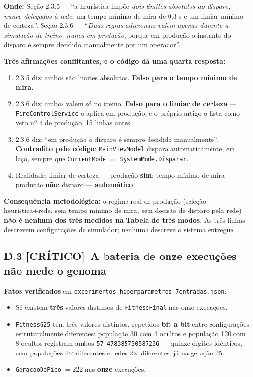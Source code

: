 \documentclass[11pt,a4paper]{article}
\newcommand{\critico}{\textbf{\color{red!60!black}[CRÍTICO]}}
\begin{document}
\textbf{Onde:} Seção 2.3.5 --- ``a heurística impõe \emph{dois limites absolutos ao disparo, nunca
delegados à rede}: um tempo mínimo de mira de 0,3 s e um limiar mínimo de certeza''. Seção 2.3.6 ---
``\emph{Duas regras adicionais valem apenas durante a simulação de treino, nunca em produção},
porque em produção o instante do disparo é sempre decidido manualmente por um operador''.

\textbf{Três afirmações conflitantes, e o código dá uma quarta resposta:}

\begin{enumerate}
  \item 2.3.5 diz: ambos são limites absolutos. \textbf{Falso para o tempo mínimo de mira.}
  \item 2.3.6 diz: ambos valem só no treino. \textbf{Falso para o limiar de certeza} ---
  \texttt{FireControlService} o aplica em produção, e o próprio artigo o lista como veto nº 4 de
  produção, 15 linhas antes.
  \item 2.3.6 diz: ``em produção o disparo é sempre decidido manualmente''. \textbf{Contradito pelo
  código}: \texttt{MainViewModel} dispara automaticamente, em laço, sempre que
  \texttt{CurrentMode == SystemMode.Disparar}.
  \item Realidade: limiar de certeza --- produção \textbf{sim}; tempo mínimo de mira --- produção
  \textbf{não}; disparo --- \textbf{automático}.
\end{enumerate}

\textbf{Consequência metodológica:} o regime real de produção (seleção heurística+rede, sem tempo
mínimo de mira, sem decisão de disparo pela rede) \textbf{não é nenhum dos três medidos na Tabela de
três modos}. As três linhas descrevem configurações do simulador; nenhuma descreve o sistema
entregue.

\subsection*{D.3 \critico\ A bateria de onze execuções não mede o genoma}

\textbf{Fatos verificados} em \texttt{experimentos\_hiperparametros\_7entradas.json}:

\begin{itemize}
  \item Só existem \textbf{três} valores distintos de \texttt{FitnessFinal} nas onze execuções.
  \item \texttt{FitnessG25} tem três valores distintos, repetidos \textbf{bit a bit} entre
  configurações estruturalmente diferentes: população 30 com 4 ocultos e população 120 com 8 ocultos
  registram ambos \texttt{57{,}478385750587236} --- quinze dígitos idênticos, com populações 4$\times$
  diferentes e redes 2$\times$ diferentes, já na geração 25.
  \item \texttt{GeracaoDoPico} $= 222$ nas \textbf{onze} execuções.
\end{itemize}
\end{document}
